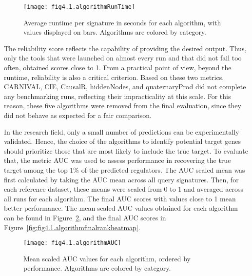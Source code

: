 \begin{figure}[htbp]
    \centering
    \texttt{[image: fig4.1.algorithmRunTime]}
    \caption[Runtime per signtures.]{Average runtime per signature in seconds for each algorithm, with values displayed on bars. Algorithms are colored by category.}
    \label{fig:fig4.1.algorithmRunTime}
\end{figure}

The reliability score reflects the capability of providing the desired output.
Thus, only the tools that were launched on almost every run and that did not fail too often, obtained scores close to 1.
From a practical point of view, beyond the runtime, reliability is also a critical criterion.
Based on these two metrics, \gls{CARNIVAL}, \gls{CIE}, CausalR, hiddenNodes, and quaternaryProd did not complete any benchmarking runs, reflecting their impracticality at this scale.
For this reason, these five algorithms were removed from the final evaluation, since they did not behave as expected for a fair comparison. 

In the research field, only a small number of predictions can be experimentally validated.
Hence, the choice of the algorithms to identify potential target genes should prioritize those that are most likely to include the true target.
To evaluate that, the metric \gls{AUC} was used to assess performance in recovering the true target among the top 1\% of the predicted regulators.
The \gls{AUC} scaled mean was first calculated by taking the \gls{AUC} mean across all query signatures. Then, for each reference dataset, these means were scaled from 0 to 1 and averaged across all runs for each algorithm.
The final \gls{AUC} scores with values close to 1 mean better performance.
The mean scaled \gls{AUC} values obtained for each algorithm can be found in Figure~\ref{fig:fig4.1.algorithmAUC}, and the final \gls{AUC} scores in Figure~\ref{fig:fig4.1.algorithmfinalrankheatmap}. 

\begin{figure}[htbp]
    \centering
    \texttt{[image: fig4.1.algorithmAUC]}
    \caption[Mean scaled \gls{AUC} values for each algorithm.]{Mean scaled \gls{AUC} values for each algorithm, ordered by performance. Algorithms are colored by category.}
    \label{fig:fig4.1.algorithmAUC}
\end{figure}

